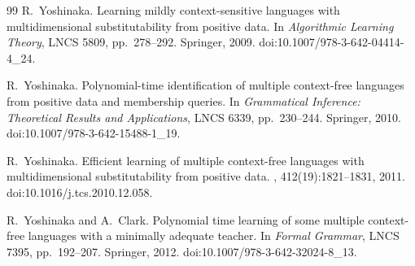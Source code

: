\documentclass[11pt,a4paper]{article}
\numberwithin{equation}{section}
\theoremstyle{plain}
\theoremstyle{definition}
\theoremstyle{remark}
\begin{document}
\begin{thebibliography}{99}
R.~Yoshinaka.
\newblock Learning mildly context-sensitive languages with multidimensional
 substitutability from positive data.
\newblock In {\em Algorithmic Learning Theory}, LNCS 5809, pp.~278--292.
 Springer, 2009.
\newblock doi:10.1007/978-3-642-04414-4\_24.

R.~Yoshinaka.
\newblock Polynomial-time identification of multiple context-free languages
from positive data and membership queries.
\newblock In {\em Grammatical Inference: Theoretical Results and Applications},
LNCS 6339, pp.~230--244. Springer, 2010.
\newblock doi:10.1007/978-3-642-15488-1\_19.

R.~Yoshinaka.
\newblock Efficient learning of multiple context-free languages with
multidimensional substitutability from positive data.
, 412(19):1821--1831, 2011.
\newblock doi:10.1016/j.tcs.2010.12.058.

R.~Yoshinaka and A.~Clark.
\newblock Polynomial time learning of some multiple context-free languages
with a minimally adequate teacher.
\newblock In {\em Formal Grammar}, LNCS 7395, pp.~192--207. Springer, 2012.
\newblock doi:10.1007/978-3-642-32024-8\_13.

\end{thebibliography}
\end{document}
